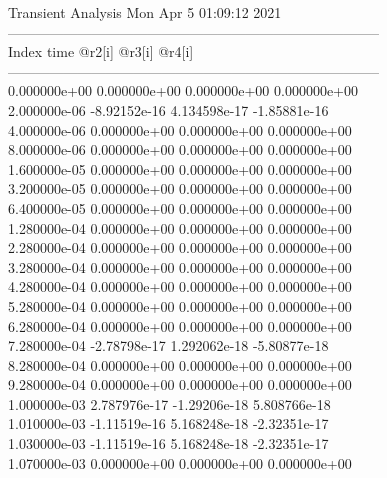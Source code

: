                                    Transient Analysis  Mon Apr  5 01:09:12  2021\\ \hline
--------------------------------------------------------------------------------\\ \hline
Index   time            @r2[i]          @r3[i]          @r4[i]          \\ \hline
--------------------------------------------------------------------------------\\ 	0.000000e+00	0.000000e+00	0.000000e+00	0.000000e+00	\\ 	2.000000e-06	-8.92152e-16	4.134598e-17	-1.85881e-16	\\ 	4.000000e-06	0.000000e+00	0.000000e+00	0.000000e+00	\\ 	8.000000e-06	0.000000e+00	0.000000e+00	0.000000e+00	\\ 	1.600000e-05	0.000000e+00	0.000000e+00	0.000000e+00	\\ 	3.200000e-05	0.000000e+00	0.000000e+00	0.000000e+00	\\ 	6.400000e-05	0.000000e+00	0.000000e+00	0.000000e+00	\\ 	1.280000e-04	0.000000e+00	0.000000e+00	0.000000e+00	\\ 	2.280000e-04	0.000000e+00	0.000000e+00	0.000000e+00	\\ 	3.280000e-04	0.000000e+00	0.000000e+00	0.000000e+00	\\ 	4.280000e-04	0.000000e+00	0.000000e+00	0.000000e+00	\\ 	5.280000e-04	0.000000e+00	0.000000e+00	0.000000e+00	\\ 	6.280000e-04	0.000000e+00	0.000000e+00	0.000000e+00	\\ 	7.280000e-04	-2.78798e-17	1.292062e-18	-5.80877e-18	\\ 	8.280000e-04	0.000000e+00	0.000000e+00	0.000000e+00	\\ 	9.280000e-04	0.000000e+00	0.000000e+00	0.000000e+00	\\ 	1.000000e-03	2.787976e-17	-1.29206e-18	5.808766e-18	\\ 	1.010000e-03	-1.11519e-16	5.168248e-18	-2.32351e-17	\\ 	1.030000e-03	-1.11519e-16	5.168248e-18	-2.32351e-17	\\ 	1.070000e-03	0.000000e+00	0.000000e+00	0.000000e+00	\\ \hline
